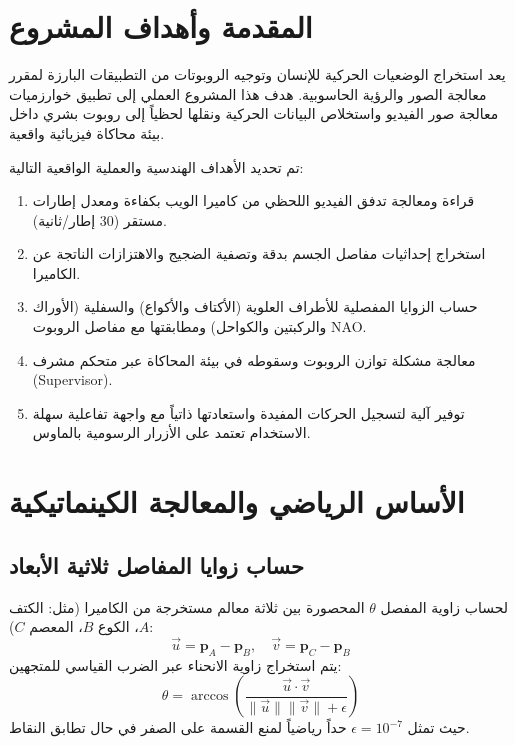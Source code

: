 \documentclass[11pt,a4paper]{article}
\begin{document}
\section{المقدمة وأهداف المشروع}
يعد استخراج الوضعيات الحركية للإنسان وتوجيه الروبوتات من التطبيقات البارزة لمقرر معالجة الصور والرؤية الحاسوبية. هدف هذا المشروع العملي إلى تطبيق خوارزميات معالجة صور الفيديو واستخلاص البيانات الحركية ونقلها لحظياً إلى روبوت بشري داخل بيئة محاكاة فيزيائية واقعية.

تم تحديد الأهداف الهندسية والعملية الواقعية التالية:
\begin{enumerate}
    \item قراءة ومعالجة تدفق الفيديو اللحظي من كاميرا الويب بكفاءة ومعدل إطارات مستقر (30 إطار/ثانية).
    \item استخراج إحداثيات مفاصل الجسم بدقة وتصفية الضجيج والاهتزازات الناتجة عن الكاميرا.
    \item حساب الزوايا المفصلية للأطراف العلوية (الأكتاف والأكواع) والسفلية (الأوراك والركبتين والكواحل) ومطابقتها مع مفاصل الروبوت NAO.
    \item معالجة مشكلة توازن الروبوت وسقوطه في بيئة المحاكاة عبر متحكم مشرف (Supervisor).
    \item توفير آلية لتسجيل الحركات المفيدة واستعادتها ذاتياً مع واجهة تفاعلية سهلة الاستخدام تعتمد على الأزرار الرسومية بالماوس.
\end{enumerate}

\section{الأساس الرياضي والمعالجة الكينماتيكية}

\subsection{حساب زوايا المفاصل ثلاثية الأبعاد}
لحساب زاوية المفصل $\theta$ المحصورة بين ثلاثة معالم مستخرجة من الكاميرا (مثل: الكتف $A$، الكوع $B$، المعصم $C$):
\begin{equation}
\vec{u} = \mathbf{p}_A - \mathbf{p}_B, \quad \vec{v} = \mathbf{p}_C - \mathbf{p}_B
\end{equation}
يتم استخراج زاوية الانحناء عبر الضرب القياسي للمتجهين:
\begin{equation}
\theta = \arccos\left( \frac{\vec{u} \cdot \vec{v}}{\|\vec{u}\| \|\vec{v}\| + \epsilon} \right)
\end{equation}
حيث تمثل $\epsilon = 10^{-7}$ حداً رياضياً لمنع القسمة على الصفر في حال تطابق النقاط.
\end{document}
